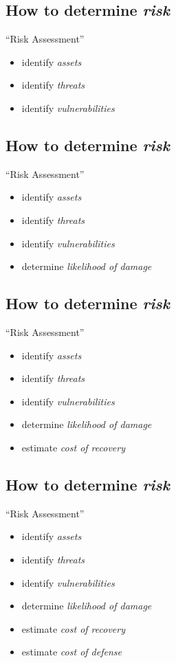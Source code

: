 \documentclass[xga]{xdvislides}
\begin{document}
\subsection{How to determine {\em risk}}
``Risk Assessment''
\begin{itemize}
	\item identify {\em assets}
	\item identify {\em threats}
	\item identify {\em vulnerabilities}
\end{itemize}

\subsection{How to determine {\em risk}}
``Risk Assessment''
\begin{itemize}
	\item identify {\em assets}
	\item identify {\em threats}
	\item identify {\em vulnerabilities}
	\item determine {\em likelihood of damage}
\end{itemize}

\subsection{How to determine {\em risk}}
``Risk Assessment''
\begin{itemize}
	\item identify {\em assets}
	\item identify {\em threats}
	\item identify {\em vulnerabilities}
	\item determine {\em likelihood of damage}
	\item estimate {\em cost of recovery}
\end{itemize}

\subsection{How to determine {\em risk}}
``Risk Assessment''
\begin{itemize}
	\item identify {\em assets}
	\item identify {\em threats}
	\item identify {\em vulnerabilities}
	\item determine {\em likelihood of damage}
	\item estimate {\em cost of recovery}
	\item estimate {\em cost of defense}
\end{itemize}
\end{document}
